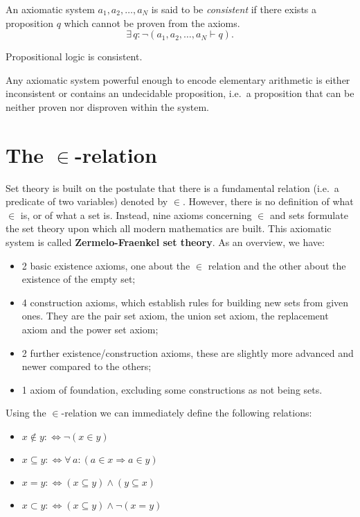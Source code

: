 \documentclass[root.tex]{subfiles}
\begin{document}
\begin{mydef}
An axiomatic system $a_1,a_2,\ldots,a_N$ is said to be \emph{consistent} if there exists a proposition $q$ which cannot be proven from the axioms.
$$
\exists \, q : \neg (a_1,a_2,\ldots,a_N \vdash q).
$$
\end{mydef}

\begin{theorem}
  Propositional logic is consistent.
\end{theorem}

\begin{theorem}[Godel]
Any axiomatic system powerful enough to encode elementary arithmetic is either inconsistent or contains an undecidable proposition, i.e.\ a proposition that can be neither proven nor disproven within the system.
\end{theorem}

\section{The $\in$-relation}

Set theory is built on the postulate that there is a fundamental relation (i.e.\ a predicate of two variables) denoted by $\in$. However, there is no definition of what $\in$ is, or of what a set is. Instead, nine axioms concerning $\in$ and sets formulate the set theory upon which all modern mathematics are built. This axiomatic system is called \textbf{Zermelo-Fraenkel set theory}. As an overview, we have:

\begin{itemize}
\item 2 basic existence axioms, one about the $\in$ relation and the other about the existence of the empty set;
\item 4 construction axioms, which establish rules for building new sets from given ones.
They are the pair set axiom, the union set axiom, the replacement axiom and the power set axiom; 
\item 2 further existence/construction axioms, these are slightly more advanced and newer compared to the others;
\item 1 axiom of foundation, excluding some constructions as not being sets.
\end{itemize}
Using the $\in$-relation we can immediately define the following relations:
\begin{itemize}
  \item $x\notin y :\Leftrightarrow \neg(x\in y)$
  \item $x\subseteq y :\Leftrightarrow \forall \, a : (a\in x \Rightarrow a\in y)$
\item $x = y :\Leftrightarrow (x\subseteq y) \land (y\subseteq x)$
\item $x \subset y :\Leftrightarrow (x \subseteq y) \land \neg (x = y)$
\end{itemize}
\end{document}
